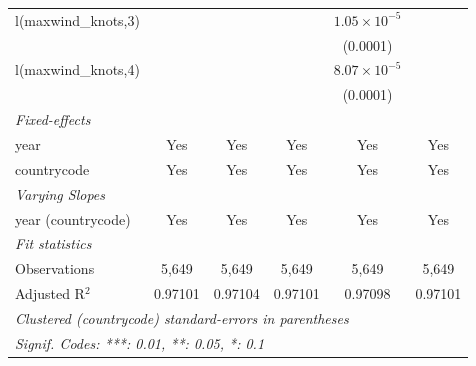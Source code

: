 \begin{tabular}{lccccc}
   l(maxwind\_knots,3)                                        &                &                         &                & $1.05\times 10^{-5}$    &   \\   
                                                              &                &                         &                & (0.0001)                &   \\   
   l(maxwind\_knots,4)                                        &                &                         &                & $8.07\times 10^{-5}$    &   \\   
                                                              &                &                         &                & (0.0001)                &   \\   
   \midrule
   \emph{Fixed-effects}\\
   year                                                       & Yes            & Yes                     & Yes            & Yes                     & Yes\\  
   countrycode                                                & Yes            & Yes                     & Yes            & Yes                     & Yes\\  
   \midrule
   \emph{Varying Slopes}\\
   year (countrycode)                                         & Yes            & Yes                     & Yes            & Yes                     & Yes\\  
   \midrule
   \emph{Fit statistics}\\
   Observations                                               & 5,649          & 5,649                   & 5,649          & 5,649                   & 5,649\\  
   Adjusted R$^2$                                             & 0.97101        & 0.97104                 & 0.97101        & 0.97098                 & 0.97101\\  
   \midrule \midrule
   \multicolumn{6}{l}{\emph{Clustered (countrycode) standard-errors in parentheses}}\\
   \multicolumn{6}{l}{\emph{Signif. Codes: ***: 0.01, **: 0.05, *: 0.1}}\\
\end{tabular}
\par\endgroup



